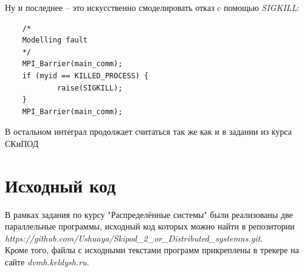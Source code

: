 \documentclass[a4paper]{article}
\begin{document}
Ну и последнее -- это искусственно смоделировать отказ c помощью \textit{SIGKILL}:\\ 
\begin{lstlisting}
	/*
    Modelling fault
    */
    MPI_Barrier(main_comm);
    if (myid == KILLED_PROCESS) {
            raise(SIGKILL);
    }
    MPI_Barrier(main_comm);

\end{lstlisting}


В остальном интеграл продолжает считаться так же как и в задании из курса СКиПОД


\section{Исходный код}
В рамках задания по курсу "Распределённые системы" были реализованы две параллельные программы, исходный код которых можно найти в репозитории \\
\textit{https://github.com/Ushuaya/Skipod\_2\_or\_Distributed\_systemns.git}. 
\\Кроме того, файлы с исходными текстами программ прикреплены в трекере на сайте \textit{dvmh.keldysh.ru}.
\end{document}

